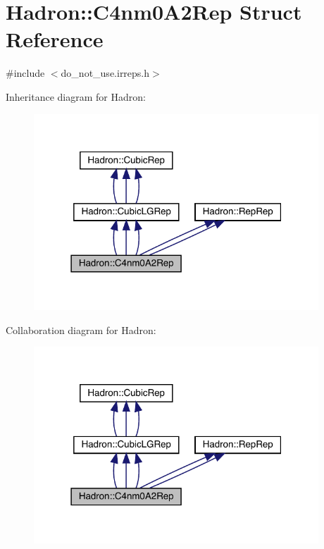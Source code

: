 \hypertarget{structHadron_1_1C4nm0A2Rep}{}\section{Hadron\+:\+:C4nm0\+A2\+Rep Struct Reference}
\label{structHadron_1_1C4nm0A2Rep}


{\ttfamily \#include $<$do\+\_\+not\+\_\+use.\+irreps.\+h$>$}



Inheritance diagram for Hadron\+:
\nopagebreak
\begin{figure}[H]
\begin{center}
\leavevmode
\includegraphics[width=303pt]{de/d1f/structHadron_1_1C4nm0A2Rep__inherit__graph}
\end{center}
\end{figure}


Collaboration diagram for Hadron\+:
\nopagebreak
\begin{figure}[H]
\begin{center}
\leavevmode
\includegraphics[width=303pt]{d7/dde/structHadron_1_1C4nm0A2Rep__coll__graph}
\end{center}
\end{figure}

